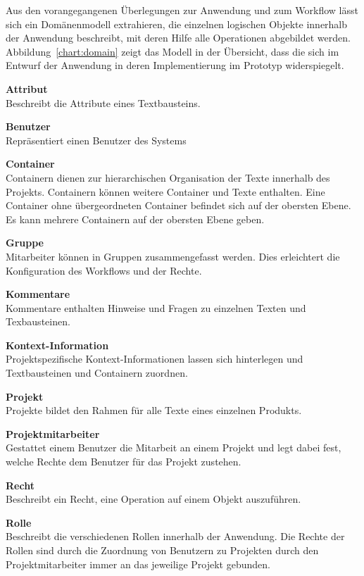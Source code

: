 Aus den vorangegangenen Überlegungen zur Anwendung und zum Workflow lässt sich ein Domänenmodell extrahieren, die einzelnen logischen Objekte innerhalb der Anwendung beschreibt, mit deren Hilfe alle Operationen abgebildet werden. Abbildung~\ref{chart:domain} zeigt das Modell in der Übersicht, dass die sich im Entwurf der Anwendung in deren Implementierung im Prototyp widerspiegelt.

\textsf{\textbf{Attribut}}\\Beschreibt die Attribute eines Textbausteins.

\textsf{\textbf{Benutzer}}\\Repräsentiert einen Benutzer des Systems

\textsf{\textbf{Container}}\\Containern dienen zur hierarchischen Organisation der Texte innerhalb des Projekts. Containern können weitere Container und Texte enthalten. Eine Container ohne übergeordneten Container befindet sich auf der obersten Ebene. Es kann mehrere Containern auf der obersten Ebene geben.

\textsf{\textbf{Gruppe}}\\Mitarbeiter können in Gruppen zusammengefasst werden. Dies erleichtert die Konfiguration des Workflows und der Rechte.

\textsf{\textbf{Kommentare}}\\Kommentare enthalten Hinweise und Fragen zu einzelnen Texten und Texbausteinen.

\textsf{\textbf{Kontext-Information}}\\Projektspezifische Kontext-Informationen lassen sich hinterlegen und Textbausteinen und Containern zuordnen.

\textsf{\textbf{Projekt}}\\Projekte bildet den Rahmen für alle Texte eines einzelnen Produkts.

\textsf{\textbf{Projektmitarbeiter}}\\Gestattet einem Benutzer die Mitarbeit an einem Projekt und legt dabei fest, welche Rechte dem Benutzer für das Projekt zustehen.

\textsf{\textbf{Recht}}\\Beschreibt ein Recht, eine Operation auf einem Objekt auszuführen.

\textsf{\textbf{Rolle}}\\Beschreibt die verschiedenen Rollen innerhalb der Anwendung. Die Rechte der Rollen sind durch die Zuordnung von Benutzern zu Projekten durch den Projektmitarbeiter immer an das jeweilige Projekt gebunden.

